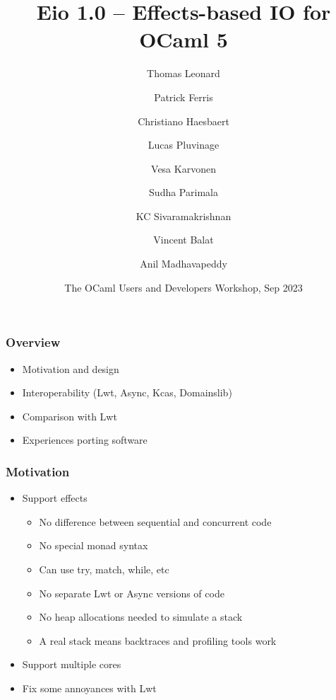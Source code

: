 \documentclass{beamer}
\title[Eio]{Eio 1.0 – Effects-based IO for OCaml 5}
\author[Thomas Leonard]
{Thomas Leonard\and Patrick Ferris\and Christiano Haesbaert\and Lucas Pluvinage\and Vesa Karvonen\and Sudha Parimala\and KC Sivaramakrishnan\and Vincent Balat\and Anil Madhavapeddy}
\institute{Tarides}
\date[OCaml 2023]{The OCaml Users and Developers Workshop, Sep 2023}
\newcommand\mlkeyword[1]{{\ttfamily\color{darkblue} #1}}
\begin{document}

\frame{\titlepage}

\begin{frame}
	\frametitle{Overview}
	\begin{itemize}
		\item Motivation and design
		\item Interoperability (Lwt, Async, Kcas, Domainslib)
		\item Comparison with Lwt
		\item Experiences porting software
	\end{itemize}
\end{frame}

\begin{frame}[fragile]
	\frametitle{Motivation}
	\begin{itemize}
		\item Support effects
		\begin{itemize}
			\item No difference between sequential and concurrent code
			\item No special monad syntax
			\item Can use \mlkeyword{try}, \mlkeyword{match}, \mlkeyword{while}, etc
			\item No separate Lwt or Async versions of code
			\item No heap allocations needed to simulate a stack
			\item A real stack means backtraces and profiling tools work
		\end{itemize}
		\item Support multiple cores
		\item Fix some annoyances with Lwt
	\end{itemize}
\end{frame}
\end{document}

